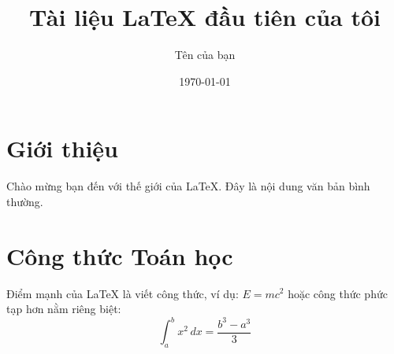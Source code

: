 \documentclass[12pt]{article} %
\title{Tài liệu LaTeX đầu tiên của tôi}
\author{Tên của bạn}
\date{\today}
\begin{document}
\maketitle %

\section{Giới thiệu}
Chào mừng bạn đến với thế giới của \LaTeX. Đây là nội dung văn bản bình thường.

\section{Công thức Toán học}
Điểm mạnh của LaTeX là viết công thức, ví dụ: $E = mc^2$ hoặc công thức phức tạp hơn nằm riêng biệt:
$$ \int_{a}^{b} x^2 \,dx = \frac{b^3 - a^3}{3} $$
\end{document}
